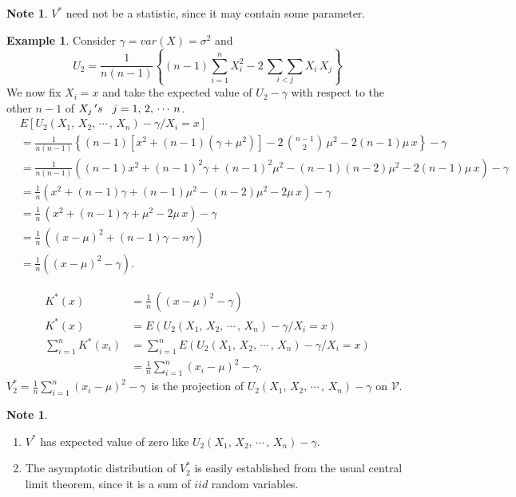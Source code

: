 \documentclass[12pt,a4paper]{report}
\theoremstyle{definition}
\newtheorem{exa}[thm]{Example}
\newtheorem{note}[thm]{Note}
\theoremstyle{plain}
\begin{document}
\begin{note}
$V^*$ need not be a statistic, since it may contain some parameter.
\end{note}


\begin{exa}
Consider $\gamma = var(X) = \sigma^2$ and $$U_2 = \frac{1}{n(n-1)}\left\{(n-1)\sum^n_{i=1}X_i^2 - 2\, \underset{i<j}{\sum\sum} X_i\,X_j\right\}$$
We now fix $X_i = x$ and take the expected value of $U_2 - \gamma$ with respect to the other $n-1$ of $X_j\, 's\hspace{0.3cm} j = 1, \, 2, \, \cdots\, n$.
\begin{align*}
& E\left[U_2\left(X_1, \, X_2, \, \cdots\, , \, X_n\right)-\gamma / X_i = x\right]\\
& = \frac{1}{n(n-1)}\left\{(n-1)[x^2 + (n-1)(\gamma + \mu^2)] - 2\, \binom{n-1}{2}\, \mu^2 - 2(n-1)\mu\, x\right\} - \gamma\\
& = \frac{1}{n(n-1)}\left((n-1)x^2 + (n-1)^2 \gamma + (n-1)^2\mu^2 - (n-1)(n-2)\mu^2 - 2(n-1)\mu\, x\right) - \gamma\\
& = \frac{1}{n}(x^2 + (n-1)\gamma + (n-1)\mu^2 - (n-2)\mu^2 - 2\mu\, x) - \gamma\\
& = \frac{1}{n} \, \left(x^2 + (n - 1)\gamma + \mu^2 - 2\mu\, x\right) - \gamma\\
& = \frac{1}{n}\, \left((x - \mu)^2 + (n - 1)\gamma - n\gamma\right)\\
& = \frac{1}{n}\left((x - \mu)^2 - \gamma\right).
\end{align*}


\begin{align*}
K^*(x) & = \frac{1}{n}\, \left((x- \mu)^2 - \gamma\right)\\
K^*(x) &= E\left(U_2(X_1, \, X_2, \, \cdots\, , \, X_n) - \gamma / X_i = x\right)\\
\sum^n_{i = 1}  K^*(x_i) & = \sum^n_{i = 1}  E\left(U_2(X_1, \, X_2, \, \cdots\, , \, X_n) - \gamma / X_i = x\right)\\
&= \frac{1}{n}\sum^n_{i = 1}(x_i  - \mu)^2 - \gamma.
\end{align*}
$V^*_2 = \frac{1}{n}\sum^n_{i = 1}(x_i - \mu)^2 - \gamma\,$ is the projection of $U_2(X_1, \, X_2, \, \cdots\, , \, X_n) - \gamma$ on $\mathcal{V}$.
\end{exa}


\begin{note}
\begin{enumerate}
\item[(a)] $V^*$ has expected value of zero like  $U_2(X_1, \, X_2, \, \cdots\, , \, X_n) - \gamma$.
\item[(b)] The asymptotic distribution of $V^*_2$ is easily established from the usual central limit theorem, since it is a sum of $iid$ random variables.
\end{enumerate}
\end{note}
\end{document}
